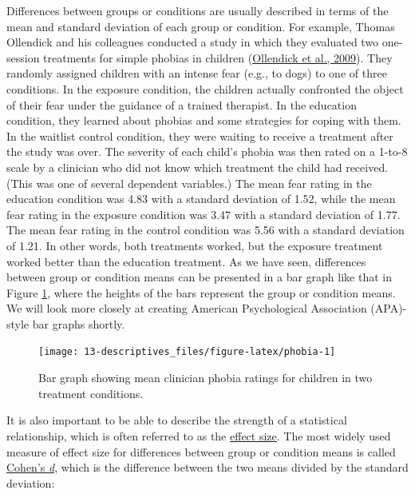 \documentclass[
]{krantz}
\begin{document}
Differences between groups or conditions are usually described in terms of the mean and standard deviation of each group or condition. For example, Thomas Ollendick and his colleagues conducted a study in which they evaluated two one-session treatments for simple phobias in children (\protect\hyperlink{ref-ollendick2009one}{Ollendick et al., 2009}). They randomly assigned children with an intense fear (e.g., to dogs) to one of three conditions. In the exposure condition, the children actually confronted the object of their fear under the guidance of a trained therapist. In the education condition, they learned about phobias and some strategies for coping with them. In the waitlist control condition, they were waiting to receive a treatment after the study was over. The severity of each child's phobia was then rated on a 1-to-8 scale by a clinician who did not know which treatment the child had received. (This was one of several dependent variables.) The mean fear rating in the education condition was 4.83 with a standard deviation of 1.52, while the mean fear rating in the exposure condition was 3.47 with a standard deviation of 1.77. The mean fear rating in the control condition was 5.56 with a standard deviation of 1.21. In other words, both treatments worked, but the exposure treatment worked better than the education treatment. As we have seen, differences between group or condition means can be presented in a bar graph like that in Figure \ref{fig:phobia}, where the heights of the bars represent the group or condition means. We will look more closely at creating American Psychological Association (APA)-style bar graphs shortly.

\begin{figure}

{\centering \texttt{[image: 13-descriptives\_files/figure-latex/phobia-1]} 

}

\caption{Bar graph showing mean clinician phobia ratings for children in two treatment conditions.}\label{fig:phobia}
\end{figure}

It is also important to be able to describe the strength of a statistical relationship, which is often referred to as the \protect\hyperlink{effect-size}{effect size}. The most widely used measure of effect size for differences between group or condition means is called \protect\hyperlink{cohens-d}{Cohen's \emph{d}}, which is the difference between the two means divided by the standard deviation:
\end{document}
